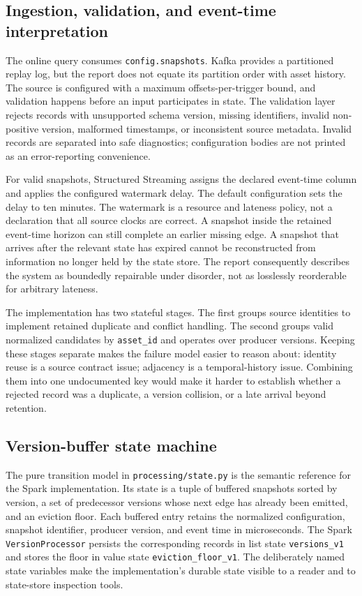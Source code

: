 \documentclass[a4paper,11pt]{article}
\begin{document}
\subsection{Ingestion, validation, and event-time interpretation}

The online query consumes \texttt{config.snapshots}. Kafka provides a partitioned replay log, but the report does not equate its partition order with asset history. The source is configured with a maximum offsets-per-trigger bound, and validation happens before an input participates in state. The validation layer rejects records with unsupported schema version, missing identifiers, invalid non-positive version, malformed timestamps, or inconsistent source metadata. Invalid records are separated into safe diagnostics; configuration bodies are not printed as an error-reporting convenience.

For valid snapshots, Structured Streaming assigns the declared event-time column and applies the configured watermark delay. The default configuration sets the delay to ten minutes. The watermark is a resource and lateness policy, not a declaration that all source clocks are correct. A snapshot inside the retained event-time horizon can still complete an earlier missing edge. A snapshot that arrives after the relevant state has expired cannot be reconstructed from information no longer held by the state store. The report consequently describes the system as boundedly repairable under disorder, not as losslessly reorderable for arbitrary lateness.

The implementation has two stateful stages. The first groups source identities to implement retained duplicate and conflict handling. The second groups valid normalized candidates by \texttt{asset\_id} and operates over producer versions. Keeping these stages separate makes the failure model easier to reason about: identity reuse is a source contract issue; adjacency is a temporal-history issue. Combining them into one undocumented key would make it harder to establish whether a rejected record was a duplicate, a version collision, or a late arrival beyond retention.

\subsection{Version-buffer state machine}

The pure transition model in \texttt{processing/state.py} is the semantic reference for the Spark implementation. Its state is a tuple of buffered snapshots sorted by version, a set of predecessor versions whose next edge has already been emitted, and an eviction floor. Each buffered entry retains the normalized configuration, snapshot identifier, producer version, and event time in microseconds. The Spark \texttt{VersionProcessor} persists the corresponding records in list state \texttt{versions\_v1} and stores the floor in value state \texttt{eviction\_floor\_v1}. The deliberately named state variables make the implementation's durable state visible to a reader and to state-store inspection tools.
\end{document}
